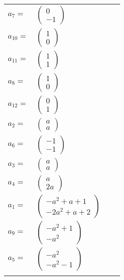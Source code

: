 \documentclass[1p]{elsarticle_modified}
\theoremstyle{definition}
\begin{document}
\begin{tabular}{m{7pt} m{180pt} m{7pt} m{180pt} }
\flushright $a_{7}=$&$\begin{pmatrix}0\\-1\end{pmatrix}$ \\
\flushright $a_{10}=$&$\begin{pmatrix}1\\0\end{pmatrix}$ \\
\flushright $a_{11}=$&$\begin{pmatrix}1\\1\end{pmatrix}$ \\
\flushright $a_{8}=$&$\begin{pmatrix}1\\0\end{pmatrix}$ \\
\flushright $a_{12}=$&$\begin{pmatrix}0\\1\end{pmatrix}$ \\
\flushright $a_{2}=$&$\begin{pmatrix}a\\a\end{pmatrix}$ \\
\flushright $a_{6}=$&$\begin{pmatrix}-1\\-1\end{pmatrix}$ \\
\flushright $a_{3}=$&$\begin{pmatrix}a\\a\end{pmatrix}$ \\
\flushright $a_{4}=$&$\begin{pmatrix}a\\2 a\end{pmatrix}$ \\
\flushright $a_{1}=$&$\begin{pmatrix}- a^2+a+1\\-2 a^2+a+2\end{pmatrix}$ \\
\flushright $a_{9}=$&$\begin{pmatrix}- a^2+1\\- a^2\end{pmatrix}$ \\
\flushright $a_{5}=$&$\begin{pmatrix}- a^2\\- a^2-1\end{pmatrix}$\\&\end{tabular}
\end{document}
